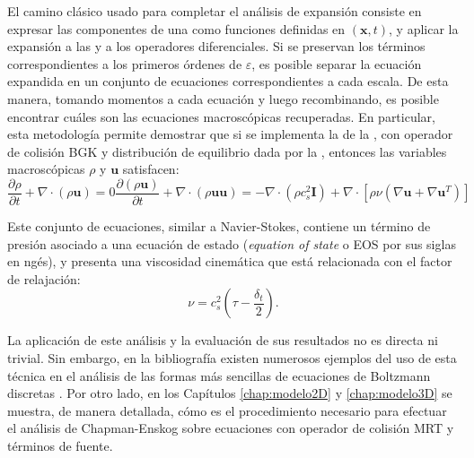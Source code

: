 El camino cl\'asico usado para completar el an\'alisis de expansi\'on consiste en expresar las componentes de una \lbe{} como funciones definidas en $(\bm{x},t)$, y aplicar la expansi\'on a las \fdp{} y a los operadores diferenciales. Si se preservan los t\'erminos correspondientes a los primeros \'ordenes de $\varepsilon$, es posible separar la ecuaci\'on expandida en un conjunto de ecuaciones correspondientes a cada escala. De esta manera, tomando momentos a cada ecuaci\'on y luego recombinando, es posible encontrar cu\'ales son las ecuaciones macrosc\'opicas recuperadas. En particular, esta metodolog\'ia permite demostrar que si se implementa la \lbe{} de la , con operador de colisi\'on BGK y distribuci\'on de equilibrio dada por la , entonces las variables macrosc\'opicas $\rho$ y $\bm{u}$ satisfacen:
\begin{subequations}
	\begin{equation}
		\dfrac{\partial \rho}{\partial t}  + \nabla \cdot (\rho \bm{u})=0
	\end{equation}
	\begin{equation}
	\dfrac{\partial (\rho \bm{u})}{\partial t}  + \nabla \cdot (\rho \bm{u}\bm{u})=-\nabla \cdot (\rho c_s^2 \bm{I}) + \nabla \cdot [\rho \nu (\nabla \bm{u}+\nabla \bm{u}^T)]
	\end{equation}
\end{subequations}

Este conjunto de ecuaciones, similar a Navier-Stokes, contiene un t\'ermino de presi\'on asociado a una ecuaci\'on de estado (\emph{equation of state} o EOS por sus siglas en ng\'es), y presenta una viscosidad cinem\'atica que est\'a relacionada con el factor de relajaci\'on:
\begin{equation}
	\nu = c_s^2 \left( \tau - \dfrac{\delta_t}{2} \right).
\end{equation}

La aplicaci\'on de este an\'alisis y la evaluaci\'on de sus resultados no es directa ni trivial. Sin embargo, en la bibliograf\'ia existen numerosos ejemplos del uso de esta t\'ecnica en el an\'alisis de las formas m\'as sencillas de ecuaciones de Boltzmann discretas \cite{kruger_lattice_2017, succi_lattice_2001, succi_lattice_2018, guo_lattice_2013}. Por otro lado, en los Cap\'itulos \ref{chap:modelo2D} y \ref{chap:modelo3D} se muestra, de manera detallada, c\'omo es el procedimiento necesario para efectuar el an\'alisis de Chapman-Enskog sobre ecuaciones con operador de colisi\'on MRT y t\'erminos de fuente.


